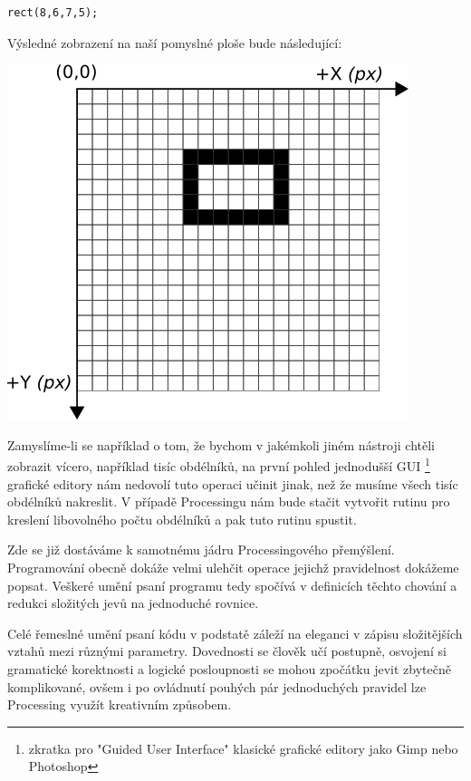 \documentclass[12pt,twopage]{book}
\begin{document}
\begin{lstlisting}
rect(8,6,7,5);
\end{lstlisting}

Výsledné zobrazení na naší pomyslné ploše bude následující:

\begin{center}
\includegraphics[scale = 1]{imgs/gridRect2d.png}
\end{center}


Zamyslíme-li se například o tom, že bychom v jakémkoli jiném nástroji chtěli zobrazit vícero, například tisíc obdélníků, na první pohled jednodušší GUI \footnote{zkratka pro "Guided User Interface" klasické grafické editory jako Gimp nebo Photoshop} grafické editory nám nedovolí tuto operaci učinit jinak, než že musíme všech tisíc obdélníků nakreslit. V případě Processingu nám bude stačit vytvořit rutinu pro kreslení libovolného počtu obdélníků a pak tuto rutinu spustit.

Zde se již dostáváme k samotnému jádru Processingového přemýšlení. Programování obecně dokáže velmi ulehčit operace jejichž pravidelnost dokážeme popsat. Veškeré umění psaní programu tedy spočívá v definicích těchto chování a redukci složitých jevů na jednoduché rovnice.

Celé řemeslné umění psaní kódu v podstatě záleží na eleganci v zápisu složitějších vztahů mezi různými parametry. Dovednosti se člověk učí postupně, osvojení si gramatické korektnosti a logické posloupnosti se mohou zpočátku jevit zbytečně komplikované, ovšem i po ovládnutí pouhých pár jednoduchých pravidel lze Processing využít kreativním způsobem.
\end{document}
